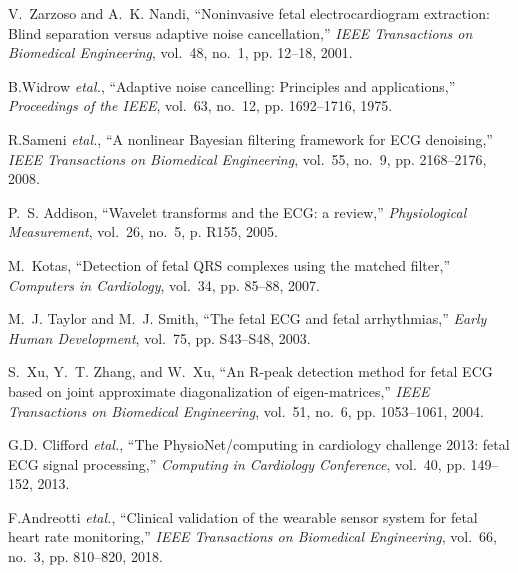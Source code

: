 \documentclass[10pt, conference]{IEEEtran}
\begin{document}
\begin{thebibliography}{00}
	 V.~Zarzoso and A.~K. Nandi, ``Noninvasive fetal electrocardiogram extraction: Blind separation versus adaptive noise cancellation,'' \emph{IEEE Transactions on Biomedical Engineering}, vol.~48, no.~1, pp. 12--18, 2001.

	 B.Widrow \emph{etal.}, ``Adaptive noise cancelling: Principles and applications,'' \emph{Proceedings of the IEEE}, vol.~63, no.~12, pp. 1692--1716, 1975.

	 R.Sameni \emph{etal.}, ``A nonlinear Bayesian filtering framework for ECG denoising,'' \emph{IEEE Transactions on Biomedical Engineering}, vol.~55, no.~9, pp. 2168--2176, 2008.

	 P.~S. Addison, ``Wavelet transforms and the ECG: a review,'' \emph{Physiological Measurement}, vol.~26, no.~5, p. R155, 2005.

	 M.~Kotas, ``Detection of fetal QRS complexes using the matched filter,'' \emph{Computers in Cardiology}, vol.~34, pp. 85--88, 2007.

	 M.~J. Taylor and M.~J. Smith, ``The fetal ECG and fetal arrhythmias,'' \emph{Early Human Development}, vol.~75, pp. S43--S48, 2003.

	 S.~Xu, Y.~T. Zhang, and W.~Xu, ``An R-peak detection method for fetal ECG based on joint approximate diagonalization of eigen-matrices,'' \emph{IEEE Transactions on Biomedical Engineering}, vol.~51, no.~6, pp. 1053--1061, 2004.

	 G.D. Clifford \emph{etal.}, ``The PhysioNet/computing in cardiology challenge 2013: fetal ECG signal processing,'' \emph{Computing in Cardiology Conference}, vol.~40, pp. 149--152, 2013.

	 F.Andreotti \emph{etal.}, ``Clinical validation of the wearable sensor system for fetal heart rate monitoring,'' \emph{IEEE Transactions on Biomedical Engineering}, vol.~66, no.~3, pp. 810--820, 2018.


\end{thebibliography}
\end{document}
